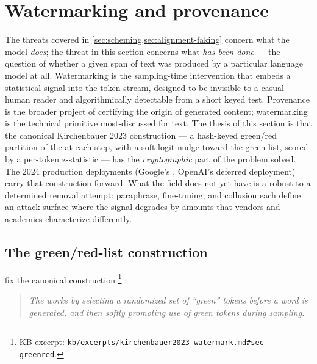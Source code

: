 
\section{Watermarking and provenance}
\label{sec:watermarking}

The threats covered in \cref{sec:scheming,sec:alignment-faking} concern
what the model \emph{does}; the threat in this section concerns what
\emph{has been done} --- the question of whether a given span of text
was produced by a particular language model at all. Watermarking is the
sampling-time intervention that embeds a statistical signal into the
token stream, designed to be invisible to a casual human reader and
algorithmically detectable from a short keyed test. Provenance is the
broader project of certifying the origin of generated content;
watermarking is the technical primitive most-discussed for text. The
thesis of this section is that the canonical Kirchenbauer 2023
construction --- a hash-keyed green/red partition of the  at
each step, with a soft logit nudge toward the green list, scored by a
per-token z-statistic --- has the \emph{cryptographic} part of the
problem solved. The 2024 production deployments (Google's
, OpenAI's deferred deployment) carry that construction
forward. What the field does not yet have is a  robust to a
determined removal attempt: paraphrase, fine-tuning, and collusion
each define an attack surface where the signal degrades by amounts
that vendors and academics characterize differently.

\subsection{The green/red-list construction}
\label{sec:watermarking-construction}

\citet{kirchenbauer2023-watermark} fix the canonical construction%
\footnote{KB excerpt: \nolinkurl{kb/excerpts/kirchenbauer2023-watermark.md#sec-greenred}.}
\citep[\S{}abstract]{kirchenbauer2023-watermark}:

\begin{quote}\itshape
The  works by selecting a randomized set of ``green'' tokens
before a word is generated, and then softly promoting use of green
tokens during sampling.
\end{quote}

